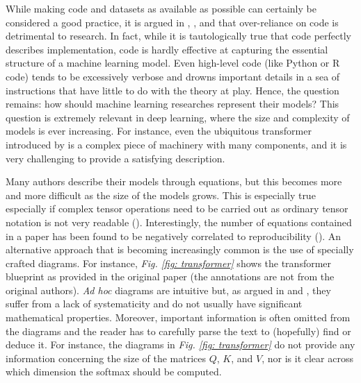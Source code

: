 \documentclass[11pt,a4paper,openright,twoside]{report}
\theoremstyle{plain}
\theoremstyle{definition}
\begin{document}
While making code and datasets as available as possible can certainly be considered a good practice, it is argued in \cite{abbott2024neural}, \cite{khatri2024anatomy}, and \cite{phuong2022formal} that over-reliance on code is detrimental to research. In fact, while it is tautologically true that code perfectly describes implementation, code is hardly effective at capturing the essential structure of a machine learning model. Even high-level code (like Python or R code) tends to be excessively verbose and drowns important details in a sea of instructions that have little to do with the theory at play. Hence, the question remains: how should machine learning researches represent their models? This question is extremely relevant in deep learning, where the size and complexity of models is ever increasing. For instance, even the ubiquitous transformer introduced by \cite{vaswani2017attention} is a complex piece of machinery with many components, and it is very challenging to provide a satisfying description.

Many authors describe their models through equations, but this becomes more and more difficult as the size of the models grows. This is especially true especially if complex tensor operations need to be carried out as ordinary tensor notation is not very readable (\cite{xu2023graph}). Interestingly, the number of equations contained in a paper has been found to be negatively correlated to reproducibility (\cite{raff2019step}). An alternative approach that is becoming increasingly common is the use of specially crafted diagrams. For instance, \textit{Fig. \ref{fig: transformer}} shows the transformer blueprint as provided in the original paper \cite{vaswani2017attention} (the annotations are not from the original authors). \textit{Ad hoc} diagrams are intuitive but, as argued in \cite{abbott2024neural} and \cite{khatri2024anatomy}, they suffer from a lack of systematicity and do not usually have significant mathematical properties.
Moreover, important information is often omitted from the diagrams and the reader has to carefully parse the text to (hopefully) find or deduce it. For instance, the diagrams in \textit{Fig. \ref{fig: transformer}} do not provide any information concerning the size of the matrices $Q$, $K$, and $V$, nor is it clear across which dimension the softmax should be computed.
\end{document}
